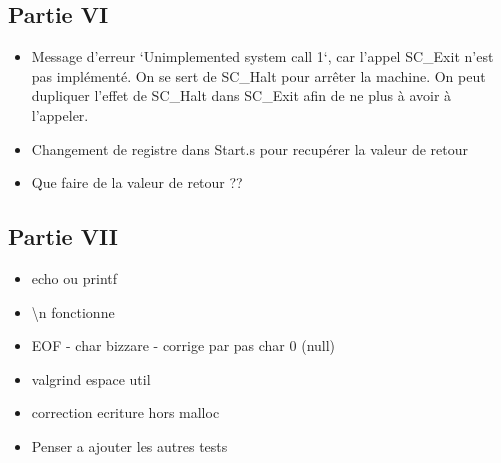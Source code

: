 \documentclass{article}
\begin{document}
\subsection{Partie VI}
\begin{itemize}
	\item Message d'erreur `Unimplemented system call 1`, car l'appel SC\_Exit n'est pas
	      implémenté. On se sert de SC\_Halt pour arrêter la machine. On peut dupliquer
	      l'effet de SC\_Halt dans SC\_Exit afin de ne plus à avoir à l'appeler.
	\item Changement de registre dans Start.s pour recupérer la valeur de retour
	\item Que faire de la valeur de retour ??
\end{itemize}

\subsection{Partie VII}
\begin{itemize}
	\item echo ou printf
	\item \textbackslash n fonctionne
	\item EOF - char bizzare - corrige par pas char 0 (null)
	\item valgrind espace util
	\item correction ecriture hors malloc
	\item Penser a ajouter les autres tests
\end{itemize}
\end{document}

